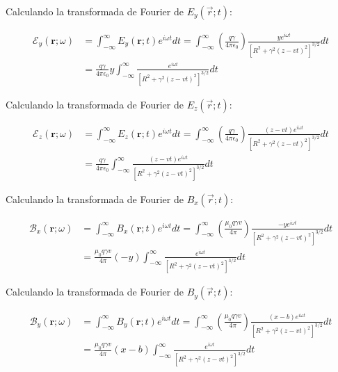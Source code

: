 \documentclass[a4paper,10pt]{article}
\begin{document}
Calculando la transformada de Fourier de $E_y(\vec{r};t)$:

\begin{equation}
\begin{aligned}
\mathcal{E}_y(\textbf{r};\omega)		&= \int_{-\infty}^{\infty} E_y(\textbf{r};t)e^{i\omega t} dt
					=\int_{-\infty}^{\infty} \left( \frac{q\gamma}{4\pi \epsilon_0} \right) \frac{ye^{i\omega t}}{[R^2+\gamma^2(z-vt)^2]^{3/2}} dt	\\
					&=\frac{q\gamma}{4\pi \epsilon_0} y\int_{-\infty}^{\infty} \frac{e^{i\omega t}}{[R^2+\gamma^2(z-vt)^2]^{3/2}} dt
\end{aligned}
\end{equation}

Calculando la transformada de Fourier de $E_z(\vec{r};t)$:

\begin{equation}
\begin{aligned}
\mathcal{E}_z(\textbf{r};\omega)		&= \int_{-\infty}^{\infty} E_z(\textbf{r};t)e^{i\omega t} dt
					=\int_{-\infty}^{\infty} \left( \frac{q\gamma}{4\pi \epsilon_0} \right) \frac{(z-vt)e^{i\omega t}}{[R^2+\gamma^2(z-vt)^2]^{3/2}} dt	\\
					&=\frac{q\gamma}{4\pi \epsilon_0} \int_{-\infty}^{\infty} \frac{(z-vt)e^{i\omega t}}{[R^2+\gamma^2(z-vt)^2]^{3/2}} dt
\end{aligned}
\end{equation}

Calculando la transformada de Fourier de $B_x(\vec{r};t)$:

\begin{equation}
\begin{aligned}
\mathcal{B}_x(\textbf{r};\omega)		&= \int_{-\infty}^{\infty} B_x(\textbf{r};t)e^{i\omega t} dt
					=\int_{-\infty}^{\infty} \left( \frac{\mu_0q\gamma v}{4\pi} \right) \frac{-ye^{i\omega t}}{[R^2+\gamma^2(z-vt)^2]^{3/2}} dt	\\
					&=\frac{\mu_0q\gamma v}{4\pi}(-y)\int_{-\infty}^{\infty} \frac{e^{i\omega t}}{[R^2+\gamma^2(z-vt)^2]^{3/2}} dt
\end{aligned}
\end{equation}

Calculando la transformada de Fourier de $B_y(\vec{r};t)$:

\begin{equation}
\begin{aligned}
\mathcal{B}_y(\textbf{r};\omega)		&= \int_{-\infty}^{\infty} B_y(\textbf{r};t)e^{i\omega t} dt
					=\int_{-\infty}^{\infty} \left( \frac{\mu_0q\gamma v}{4\pi} \right) \frac{(x-b)e^{i\omega t}}{[R^2+\gamma^2(z-vt)^2]^{3/2}} dt	\\
					&=\frac{\mu_0q\gamma v}{4\pi}(x-b)\int_{-\infty}^{\infty} \frac{e^{i\omega t}}{[R^2+\gamma^2(z-vt)^2]^{3/2}} dt
\end{aligned}
\end{equation}
\end{document}
